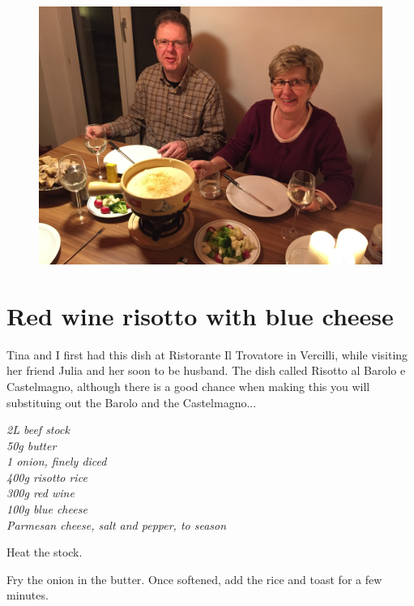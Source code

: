 \documentclass{tufte-book}
\begin{document}
\newpage

\begin{figure}[h]
  \includegraphics[width=\linewidth]{fondue.jpg}
\end{figure}

\section{Red wine risotto with blue cheese}

Tina and I first had this dish at Ristorante Il Trovatore in Vercilli, while visiting her friend Julia and her soon to be husband. The dish called Risotto al Barolo e Castelmagno, although there is a good chance when making this you will substituing out the Barolo and the Castelmagno... 

\emph{2L beef stock
\\50g butter
\\1 onion, finely diced
\\400g risotto rice
\\300g red wine
\\100g blue cheese
\\Parmesan cheese, salt and pepper, to season
}

Heat the stock.

Fry the onion in the butter. Once softened, add the rice and toast for a few minutes.
\end{document}
